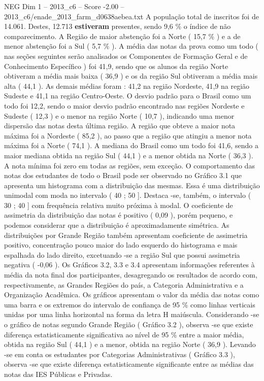 \begin{textsample}{NEG Dim 1 – 2013\_c6 – Score -2.00 – 2013\_c6/enade\_2013\_farm\_d0638aebea.txt}
A população total de inscritos foi de 14.061.
Destes, 12.713 \textbf{estiveram} presentes, sendo 9,6 \% o índice de não comparecimento.
A Região de maior abstenção foi a Norte ( 15,7 \% ) e a de menor abstenção foi a Sul ( 5,7 \% ).
A média das notas da prova como um todo ( nas seções seguintes serão analisados os Componentes de Formação Geral e de Conhecimento Específico ) foi 41,9, sendo que os alunos da região Norte obtiveram a média mais baixa ( 36,9 ) e os da região Sul obtiveram a média mais alta ( 44,1 ).
As demais médias foram : 41,2 na região Nordeste, 41,9 na região Sudeste e 41,1 na região Centro-Oeste.
O desvio padrão para o Brasil como um todo foi 12,2, sendo o maior desvio padrão encontrado nas regiões Nordeste e Sudeste ( 12,3 ) e o menor na região Norte ( 10,7 ), indicando uma menor dispersão das notas desta última região.
A região que obteve a maior nota máxima foi a Nordeste ( 85,2 ), ao passo que a região que atingiu a menor nota máxima foi a Norte ( 74,1 ).
A mediana do Brasil como um todo foi 41,6, sendo a maior mediana obtida na região Sul ( 44,1 ) e a menor obtida na Norte ( 36,3 ).
A nota mínima foi zero em todas as regiões, sem exceção.
O comportamento das notas dos estudantes de todo o Brasil pode ser observado no Gráfico 3.1 que apresenta um histograma com a distribuição das mesmas.
Essa é uma distribuição unimodal com moda no intervalo ( 40 ; 50 ].
Destaca -se, também, o intervalo ( 30 ; 40 ] com frequência relativa muito próxima à modal.
O coeficiente de assimetria da distribuição das notas é positivo ( 0,09 ), porém pequeno, e podemos considerar que a distribuição é aproximadamente simétrica.
As distribuições por Grande Região também apresentam coeficiente de assimetria positivo, concentração pouco maior do lado esquerdo do histograma e mais espalhada do lado direito, excetuando -se a região Sul que possui assimetria negativa ( -0,06 ).
Os Gráficos 3.2, 3.3 e 3.4 apresentam informações referentes à média da nota final dos participantes, desagregando os resultados de acordo com, respectivamente, as Grandes Regiões do país, a Categoria Administrativa e a Organização Acadêmica.
Os gráficos apresentam o valor da média das notas como uma barra e os extremos do intervalo de confiança de 95 \% como linhas verticais unidas por uma linha horizontal na forma da letra H maiúscula.
Considerando -se o gráfico de notas segundo Grande Região ( Gráfico 3.2 ), observa -se que existe diferença estatisticamente significativa ao nível de 95 \% entre a maior média, obtida na região Sul ( 44,1 ) e a menor, obtida na região Norte ( 36,9 ).
Levando -se em conta os estudantes por Categorias Administrativas ( Gráfico 3.3 ), observa -se que existe diferença estatisticamente significante entre as médias das notas das IES Públicas e Privadas.

\end{textsample}
